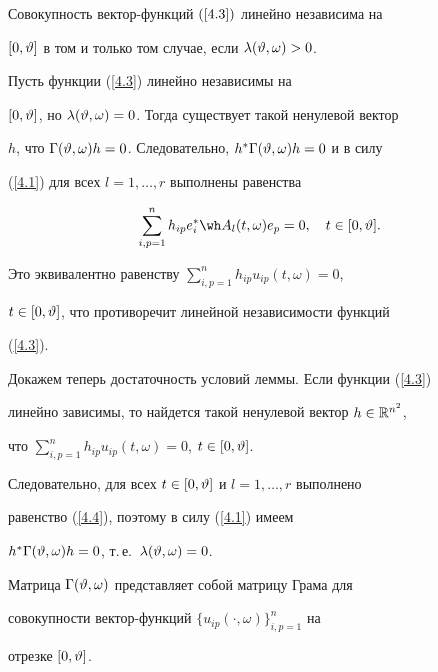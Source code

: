 \begin{lem}


\label{l4.2}


Совокупность вектор-функций $(\ref{4.3})$ линейно независима на


$[0,\vartheta]$ в том и только том случае, если $\lambda(\vartheta,\omega)>0$.


\end{lem}





\begin{pf} Пусть функции (\ref{4.3}) линейно независимы на


$[0,\vartheta]$, но $\lambda(\vartheta,\omega)=0$. Тогда существует такой ненулевой вектор


$h$, что $\Gamma(\vartheta,\omega)h=0$. Следовательно, $h^*\Gamma(\vartheta,\omega)h=0$ и в силу


(\ref{4.1}) для всех $l=1,\dotsc,r$ выполнены равенства


\begin{equation}


\label{4.4}


\sum_{i,p=1}^n h_{ip}e_i^*\wh A_l(t,\omega)e_p=0,\quad t\in[0,\vt].


\end{equation}


Это эквивалентно равенству $\sum\limits_{i, p=1}^nh_{ip}u_{ip}(t,\omega)=0$,


$t\in[0,\vartheta]$, что противоречит линейной независимости функций


(\ref{4.3}).





Докажем теперь достаточность условий леммы. Если функции (\ref{4.3})


линейно зависимы, то найдется такой ненулевой вектор $h\in\Bbb R^{n^2}$,


что $\sum\limits_{i,p=1}^n h_{ip}u_{ip}(t,\omega)=0$, $t\in[0,\vartheta]$.


Следовательно, для всех $t\in[0,\vartheta]$ и $l=1,\dotsc,r$ выполнено


равенство (\ref{4.4}), поэтому в силу (\ref{4.1}) имеем


$h^*\Gamma(\vartheta,\omega)h=0$, т.\,е.~$\lambda(\vartheta,\omega)=0$.


\end{pf}





\begin{note}


\label{rem4.1}


Матрица $\Gamma(\vartheta,\omega)$ представляет собой матрицу Грама для


совокупности вектор-функций $\{u_{ip}(\cdot,\omega)\}_{i,p=1}^n$ на


отрезке $[0,\vartheta]$.


\end{note}





